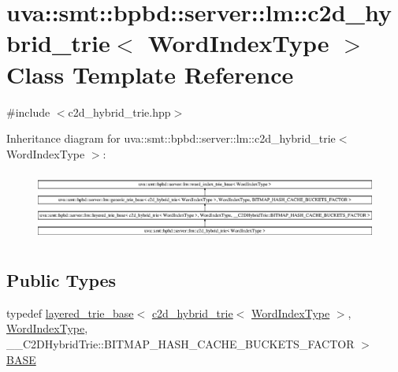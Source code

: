 \hypertarget{classuva_1_1smt_1_1bpbd_1_1server_1_1lm_1_1c2d__hybrid__trie}{}\section{uva\+:\+:smt\+:\+:bpbd\+:\+:server\+:\+:lm\+:\+:c2d\+\_\+hybrid\+\_\+trie$<$ Word\+Index\+Type $>$ Class Template Reference}
\label{classuva_1_1smt_1_1bpbd_1_1server_1_1lm_1_1c2d__hybrid__trie}


{\ttfamily \#include $<$c2d\+\_\+hybrid\+\_\+trie.\+hpp$>$}

Inheritance diagram for uva\+:\+:smt\+:\+:bpbd\+:\+:server\+:\+:lm\+:\+:c2d\+\_\+hybrid\+\_\+trie$<$ Word\+Index\+Type $>$\+:\begin{figure}[H]
\begin{center}
\leavevmode
\includegraphics[height=2.323651cm]{classuva_1_1smt_1_1bpbd_1_1server_1_1lm_1_1c2d__hybrid__trie}
\end{center}
\end{figure}
\subsection*{Public Types}
\begin{DoxyCompactItemize}
\item 
typedef \hyperlink{classuva_1_1smt_1_1bpbd_1_1server_1_1lm_1_1layered__trie__base}{layered\+\_\+trie\+\_\+base}$<$ \hyperlink{classuva_1_1smt_1_1bpbd_1_1server_1_1lm_1_1c2d__hybrid__trie}{c2d\+\_\+hybrid\+\_\+trie}$<$ \hyperlink{classuva_1_1smt_1_1bpbd_1_1server_1_1lm_1_1word__index__trie__base_a64279b5b94c421b25aedaa72e73d013c}{Word\+Index\+Type} $>$, \hyperlink{classuva_1_1smt_1_1bpbd_1_1server_1_1lm_1_1word__index__trie__base_a64279b5b94c421b25aedaa72e73d013c}{Word\+Index\+Type}, \+\_\+\+\_\+\+C2\+D\+Hybrid\+Trie\+::\+B\+I\+T\+M\+A\+P\+\_\+\+H\+A\+S\+H\+\_\+\+C\+A\+C\+H\+E\+\_\+\+B\+U\+C\+K\+E\+T\+S\+\_\+\+F\+A\+C\+T\+O\+R $>$ \hyperlink{classuva_1_1smt_1_1bpbd_1_1server_1_1lm_1_1c2d__hybrid__trie_ad3be016130a12e0f2f2981760693caca}{B\+A\+S\+E}
\end{DoxyCompactItemize}
